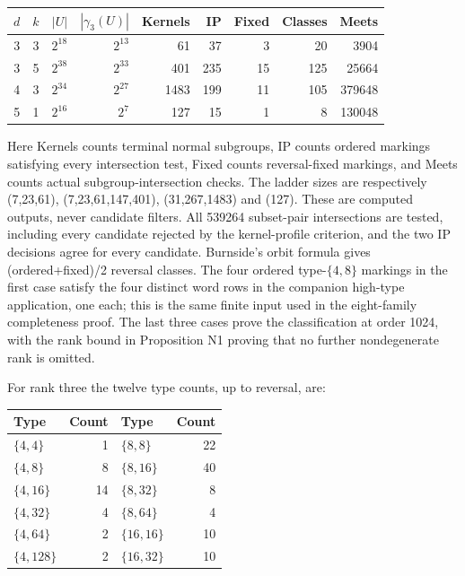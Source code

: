 \begin{center}\small
\setlength{\tabcolsep}{3pt}
\begin{tabular}{rrrrrrrrr}
\toprule
$d$ & $k$ & $|U|$ & $|\gamma_3(U)|$ & Kernels & IP & Fixed & Classes & Meets\\
\midrule
3&3&$2^{18}$&$2^{13}$&61&37&3&20&3904\\
3&5&$2^{38}$&$2^{33}$&401&235&15&125&25664\\
4&3&$2^{34}$&$2^{27}$&1483&199&11&105&379648\\
5&1&$2^{16}$&$2^7$&127&15&1&8&130048\\
\bottomrule\end{tabular}\end{center}

Here Kernels counts terminal normal subgroups, IP counts ordered markings satisfying every intersection test, Fixed counts reversal-fixed markings, and Meets counts actual subgroup-intersection checks. The ladder sizes are respectively (7,23,61), (7,23,61,147,401), (31,267,1483) and (127). These are computed outputs, never candidate filters. All 539264 subset-pair intersections are tested, including every candidate rejected by the kernel-profile criterion, and the two IP decisions agree for every candidate. Burnside's orbit formula gives (ordered+fixed)/2 reversal classes. The four ordered type-\(\{4,8\}\) markings in the first case satisfy the four distinct word rows in the companion high-type application, one each; this is the same finite input used in the eight-family completeness proof. The last three cases prove the classification at order 1024, with the rank bound in Proposition N1 proving that no further nondegenerate rank is omitted.

For rank three the twelve type counts, up to reversal, are:

{\def\LTcaptype{none} %
\begin{longtable}[]{@{}lrlr@{}}
\toprule\noalign{}
Type & Count & Type & Count \\
\midrule\noalign{}
\endhead
\bottomrule\noalign{}
\endlastfoot
\(\{4,4\}\) & 1 & \(\{8,8\}\) & 22 \\
\(\{4,8\}\) & 8 & \(\{8,16\}\) & 40 \\
\(\{4,16\}\) & 14 & \(\{8,32\}\) & 8 \\
\(\{4,32\}\) & 4 & \(\{8,64\}\) & 4 \\
\(\{4,64\}\) & 2 & \(\{16,16\}\) & 10 \\
\(\{4,128\}\) & 2 & \(\{16,32\}\) & 10 \\
\end{longtable}
}

